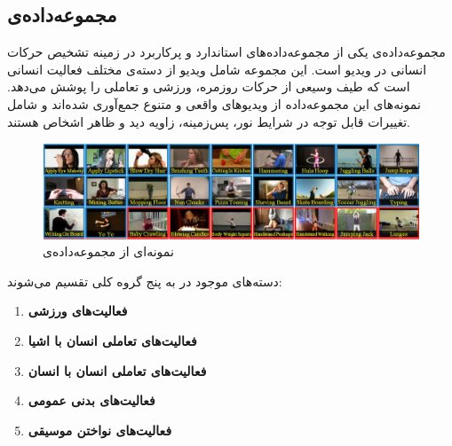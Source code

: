 \subsection{مجموعه‌داده‌ی }
مجموعه‌داده‌ی  \cite{ucf101} یکی از مجموعه‌داده‌های استاندارد و پرکاربرد در زمینه تشخیص حرکات انسانی در ویدیو است. 
این مجموعه شامل  ویدیو از  دسته‌ی مختلف فعالیت انسانی است که طیف وسیعی از حرکات روزمره، ورزشی و تعاملی را پوشش می‌دهد. 
نمونه‌های این مجموعه‌داده از ویدیوهای واقعی و متنوع جمع‌آوری شده‌اند و شامل تغییرات قابل توجه در شرایط نور، پس‌زمینه، زاویه دید و ظاهر اشخاص هستند.
\begin{figure}
	\centering\includegraphics[scale=.5]{Images/Chapter4/ucf101.png}
	\caption[]{ نمونه‌ای از مجموعه‌داده‌ی \cite{ucf101}   }
	\label{fig.41}
\end{figure}
دسته‌های موجود در  به پنج گروه کلی تقسیم می‌شوند:
\begin{enumerate}
	\item \textbf{‌فعالیت‌های ورزشی} 
	\item \textbf{فعالیت‌های تعاملی انسان با اشیا} 
	\item \textbf{فعالیت‌های تعاملی انسان با انسان} 
	\item \textbf{فعالیت‌های بدنی عمومی} 
	\item \textbf{فعالیت‌های نواختن موسیقی} 
\end{enumerate}


